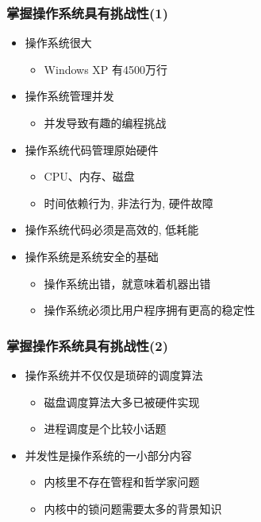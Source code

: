 \begin{frame}
    \frametitle{掌握操作系统具有挑战性(1)}
    \begin{itemize}
        \item 操作系统很大
            \begin{itemize}
                \item Windows XP 有4500万行
            \end{itemize}
        \item 操作系统管理并发
            \begin{itemize}
                \item 并发导致有趣的编程挑战
            \end{itemize}
        \item 操作系统代码管理原始硬件
            \begin{itemize}
               \item CPU、内存、磁盘
                \item 时间依赖行为, 非法行为, 硬件故障
            \end{itemize}
        \item 操作系统代码必须是高效的, 低耗能
        \item 操作系统是系统安全的基础
            \begin{itemize}
                \item 操作系统出错，就意味着机器出错
                \item 操作系统必须比用户程序拥有更高的稳定性
            \end{itemize}
        
    \end{itemize}
\end{frame}

    
\begin{frame}
    \frametitle{掌握操作系统具有挑战性(2)}
    \begin{itemize}
        \item 操作系统并不仅仅是琐碎的调度算法
            \begin{itemize}
                \item 磁盘调度算法大多已被硬件实现
                \item 进程调度是个比较小话题
            \end{itemize}
        \item 并发性是操作系统的一小部分内容
            \begin{itemize}
                \item 内核里不存在管程和哲学家问题
                \item 内核中的锁问题需要太多的背景知识
            \end{itemize}

    \end{itemize}
\end{frame}

